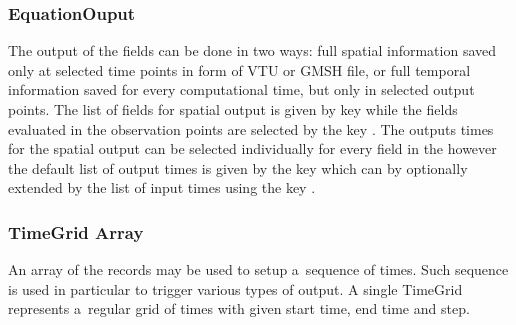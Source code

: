 \subsubsection{EquationOuput}
The output of the fields can be done in two ways: full spatial information saved only at selected time points in form of 
VTU or GMSH file, or full temporal information saved for every computational time, but only in selected output points.
The list of fields for spatial output is given by key  while the fields 
evaluated in the observation points are selected by the key .
The outputs times for the spatial output can be selected individually for every field in the 
 however the default list of output times is given by the key
 which can by optionally extended by the list of input times
using the key .

\subsubsection{TimeGrid Array}
\hypertarget{sec:TimeGrid}{}

An array of the  records may be used to setup a~sequence of times. Such sequence is used in particular 
to trigger various types of output. A single TimeGrid represents a~regular grid of times with given start time, end time and step.
